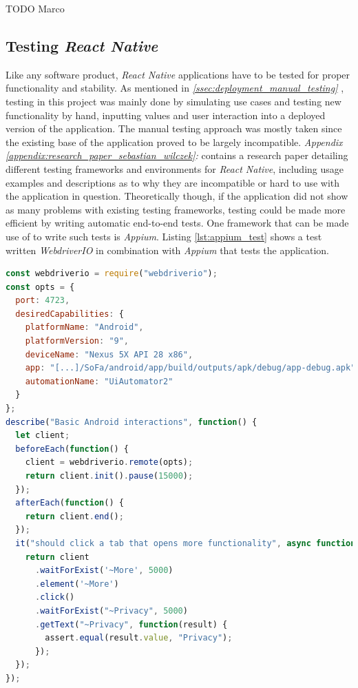 TODO Marco

\subsection{Testing \textit{React Native}}
\label{ssec:testing_react_native}

Like any software product, \textit{React Native} applications have to be tested for proper functionality and stability. As mentioned in \textit{\ref{ssec:deployment_manual_testing} }, testing in this project was mainly done by simulating use cases and testing new functionality by hand, inputting values and user interaction into a deployed version of the application.
\newline
The manual testing approach was mostly taken since the existing base of the application proved to be largely incompatible. \textit{Appendix \ref{appendix:research_paper_sebastian_wilczek}: } contains a research paper detailing different testing frameworks and environments for \textit{React Native}, including usage examples and descriptions as to why they are incompatible or hard to use with the application in question.
\newline
Theoretically though, if the application did not show as many problems with existing testing frameworks, testing could be made more efficient by writing automatic end-to-end tests. One framework that can be made use of to write such tests is \textit{Appium}. Listing \ref{lst:appium_test} shows a test written \textit{WebdriverIO} in combination with \textit{Appium} that tests the application.

\begin{lstlisting}[language=javascript, caption=\textit{Appium} end-to-end test, label=lst:appium_test]
const webdriverio = require("webdriverio");
const opts = {
  port: 4723,
  desiredCapabilities: {
    platformName: "Android",
    platformVersion: "9",
    deviceName: "Nexus 5X API 28 x86",
    app: "[...]/SoFa/android/app/build/outputs/apk/debug/app-debug.apk",
    automationName: "UiAutomator2"
  }
};
describe("Basic Android interactions", function() {
  let client;
  beforeEach(function() {
    client = webdriverio.remote(opts);
    return client.init().pause(15000);
  });
  afterEach(function() {
    return client.end();
  });
  it("should click a tab that opens more functionality", async function() {
    return client
      .waitForExist('~More', 5000)
      .element('~More')
      .click()
      .waitForExist("~Privacy", 5000)
      .getText("~Privacy", function(result) {
        assert.equal(result.value, "Privacy");
      });
  });
});
\end{lstlisting}

